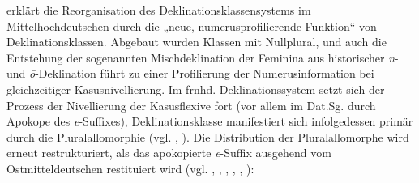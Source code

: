 \citet[169--170]{Nübling2016} erklärt die Reorganisation des Deklinationsklassensystems im Mittelhochdeutschen durch die „neue, numerusprofilierende Funktion“ von Deklinationsklassen. Abgebaut wurden Klassen mit Nullplural, und auch die Entstehung der sogenannten Mischdeklination der Feminina aus historischer \textit{n}{}- und \textit{ō}{}-Deklination führt zu einer Profilierung der Numerusinformation bei gleichzeitiger Kasusnivellierung. Im frnhd. Deklinationssystem setzt sich der Prozess der Nivellierung der Kasusflexive fort (vor allem im Dat.Sg. durch Apokope des \textit{e}{}-Suffixes), Deklinationsklasse manifestiert sich infolgedessen primär durch die Pluralallomorphie (vgl. \citealt[91]{Kürschner2008a}, \citealt[1542--1543]{WegeraSolms2000}). Die Distribution der Pluralallomorphe wird erneut restrukturiert, als das apokopierte \textit{e}{}-Suffix ausgehend vom Ostmitteldeutschen restituiert wird (vgl. \citealt[202--209]{DammelGillmann2014}, \citealt{Köpcke1994, Köpcke2000a}, \citealt[116--122]{Kürschner2008a}, \citealt[304--307]{Nübling2008}, \citealt[324--35]{Paul1968}, \citealt[1544]{WegeraSolms2000}):

